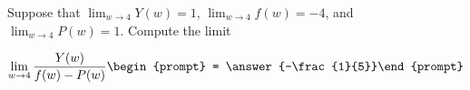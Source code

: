 \documentclass{ximera}
\author{Matthew Carr}
\begin{document}
\begin{exercise}
Suppose that $\lim_{w\to4}Y(w)=1$, $\lim_{w\to4}f(w)=-4$, and $\lim_{w\to4}P(w)=1$. Compute the limit

\[
\lim_{w\to 4 } \frac{Y(w)}{f(w)-P(w)}\begin{prompt} = \answer{-\frac{1}{5}}\end{prompt}
\]
\end{exercise}
\end{document}

